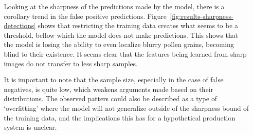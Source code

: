 Looking at the sharpness of the predictions made by the model, there is a corollary trend in the false positive predictions.
Figure~\ref{fig:results-sharpness-detections} shows that restricting the training data creates what seems to be a threshold, bellow which the model does not make predictions.
This shows that the model is losing the ability to even localize blurry pollen grains, becoming blind to their existence.
It seems clear that the features being learned from sharp images do not transfer to less sharp samples.

It is important to note that the sample size, especially in the case of false negatives, is quite low, which weakens arguments made based on their distributions.
The observed patters could also be described as a type of `overfitting' where the model will not generalize outside of the sharpness bound of the training data, and the implications this has for a hypothetical production system is unclear.

